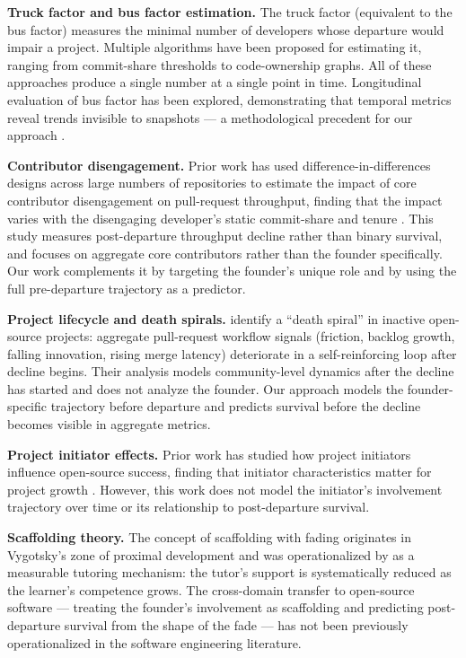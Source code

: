 \documentclass[11pt,letterpaper]{article}
\begin{document}
\textbf{Truck factor and bus factor estimation.} The truck factor (equivalent to the bus factor) measures the minimal number of developers whose departure would impair a project. Multiple algorithms have been proposed for estimating it, ranging from commit-share thresholds to code-ownership graphs. All of these approaches produce a single number at a single point in time. Longitudinal evaluation of bus factor has been explored, demonstrating that temporal metrics reveal trends invisible to snapshots --- a methodological precedent for our approach \citep{Gousios2018}.

\textbf{Contributor disengagement.} Prior work has used difference-in-differences designs across large numbers of repositories to estimate the impact of core contributor disengagement on pull-request throughput, finding that the impact varies with the disengaging developer's static commit-share and tenure \citep{Wang2019}. This study measures post-departure throughput decline rather than binary survival, and focuses on aggregate core contributors rather than the founder specifically. Our work complements it by targeting the founder's unique role and by using the full pre-departure trajectory as a predictor.

\textbf{Project lifecycle and death spirals.} \citet{Kaushik2026} identify a ``death spiral'' in inactive open-source projects: aggregate pull-request workflow signals (friction, backlog growth, falling innovation, rising merge latency) deteriorate in a self-reinforcing loop after decline begins. Their analysis models community-level dynamics after the decline has started and does not analyze the founder. Our approach models the founder-specific trajectory before departure and predicts survival before the decline becomes visible in aggregate metrics.

\textbf{Project initiator effects.} Prior work has studied how project initiators influence open-source success, finding that initiator characteristics matter for project growth \citep{Chen2021}. However, this work does not model the initiator's involvement trajectory over time or its relationship to post-departure survival.

\textbf{Scaffolding theory.} The concept of scaffolding with fading originates in Vygotsky's zone of proximal development \citep{Vygotsky1978} and was operationalized by \citet{Wood1976} as a measurable tutoring mechanism: the tutor's support is systematically reduced as the learner's competence grows. The cross-domain transfer to open-source software --- treating the founder's involvement as scaffolding and predicting post-departure survival from the shape of the fade --- has not been previously operationalized in the software engineering literature.
\end{document}
